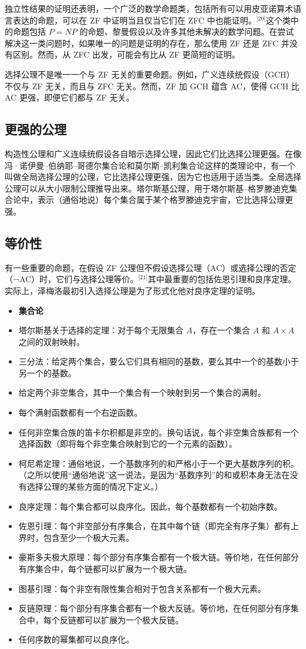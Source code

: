 独立性结果的证明还表明，一个广泛的数学命题类，包括所有可以用皮亚诺算术语言表达的命题，可以在 ZF 中证明当且仅当它们在 ZFC 中也能证明。\(^\text{[20]}\)这个类中的命题包括 \(P = NP\) 的命题、黎曼假设以及许多其他未解决的数学问题。在尝试解决这一类问题时，如果唯一的问题是证明的存在，那么使用 ZF 还是 ZFC 并没有区别。然而，从 ZFC 出发，可能会有比从 ZF 更简短的证明。

选择公理不是唯一一个与 ZF 无关的重要命题。例如，广义连续统假设（GCH）不仅与 ZF 无关，而且与 ZFC 无关。然而，ZF 加 GCH 蕴含 AC，使得 GCH 比 AC 更强，即便它们都与 ZF 无关。
\subsection{更强的公理}  
构造性公理和广义连续统假设各自暗示选择公理，因此它们比选择公理更强。在像冯·诺伊曼–伯纳耶–哥德尔集合论和莫尔斯–凯利集合论这样的类理论中，有一个叫做全局选择公理的公理，它比选择公理更强，因为它也适用于适当类。全局选择公理可以从大小限制公理推导出来。塔尔斯基公理，用于塔尔斯基–格罗滕迪克集合论中，表示（通俗地说）每个集合属于某个格罗滕迪克宇宙，它比选择公理更强。
\subsection{等价性}  
有一些重要的命题，在假设 ZF 公理但不假设选择公理（AC）或选择公理的否定（¬AC）时，它们与选择公理等价。\(^\text{[21]}\)其中最重要的包括佐恩引理和良序定理。实际上，泽梅洛最初引入选择公理是为了形式化他对良序定理的证明。

\begin{itemize}
\item \textbf{集合论} 
\item 塔尔斯基关于选择的定理：对于每个无限集合 \(A\)，存在一个集合 \(A\) 和 \(A \times A\) 之间的双射映射。  
\item 三分法：给定两个集合，要么它们具有相同的基数，要么其中一个的基数小于另一个的基数。  
\item 给定两个非空集合，其中一个集合有一个映射到另一个集合的满射。  
\item 每个满射函数都有一个右逆函数。  
\item 任何非空集合族的笛卡尔积都是非空的。换句话说，每个非空集合族都有一个选择函数（即将每个非空集合映射到它的一个元素的函数）。  
\item 柯尼希定理：通俗地说，一个基数序列的和严格小于一个更大基数序列的积。（之所以使用“通俗地说”这一说法，是因为“基数序列”的和或积本身无法在没有选择公理的某些方面的情况下定义。）  
\item 良序定理：每个集合都可以良序化。因此，每个基数都有一个初始序数。  
\item 佐恩引理：每个非空部分有序集合，在其中每个链（即完全有序子集）都有上界时，包含至少一个极大元素。  
\item 豪斯多夫极大原理：每个部分有序集合都有一个极大链。等价地，在任何部分有序集合中，每个链都可以扩展为一个极大链。  
\item 图基引理：每个非空有限性集合相对于包含关系都有一个极大元素。  
\item 反链原理：每个部分有序集合都有一个极大反链。等价地，在任何部分有序集合中，每个反链都可以扩展为一个极大反链。  
\item 任何序数的幂集都可以良序化。  
\end{itemize}

